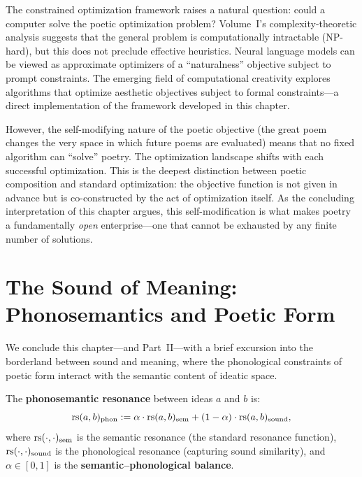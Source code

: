 \begin{remark}
\label{rem:algorithmic-limits}
The constrained optimization framework raises a natural question: could a computer solve the poetic optimization problem?  Volume~I's complexity-theoretic analysis suggests that the general problem is computationally intractable (NP-hard), but this does not preclude effective heuristics.  Neural language models can be viewed as approximate optimizers of a ``naturalness'' objective subject to prompt constraints.  The emerging field of computational creativity explores algorithms that optimize aesthetic objectives subject to formal constraints---a direct implementation of the framework developed in this chapter.

However, the self-modifying nature of the poetic objective (the great poem changes the very space in which future poems are evaluated) means that no fixed algorithm can ``solve'' poetry.  The optimization landscape shifts with each successful optimization.  This is the deepest distinction between poetic composition and standard optimization: the objective function is not given in advance but is co-constructed by the act of optimization itself.  As the concluding interpretation of this chapter argues, this self-modification is what makes poetry a fundamentally \emph{open} enterprise---one that cannot be exhausted by any finite number of solutions.
\end{remark}


\section{The Sound of Meaning: Phonosemantics and Poetic Form}

We conclude this chapter---and Part~II---with a brief excursion into the
borderland between sound and meaning, where the phonological constraints of
poetic form interact with the semantic content of ideatic space.

\begin{definition}
\label{def:phonosemantic}
The \textbf{phonosemantic resonance} between ideas $a$ and $b$ is:
\[
  \mathrm{rs}(a, b)_{\text{phon}} := \alpha \cdot \mathrm{rs}(a, b)_{\text{sem}}
  + (1 - \alpha) \cdot \mathrm{rs}(a, b)_{\text{sound}},
\]
where $\mathrm{rs}(\cdot, \cdot)_{\text{sem}}$ is the semantic resonance (the
standard resonance function), $\mathrm{rs}(\cdot, \cdot)_{\text{sound}}$ is the
phonological resonance (capturing sound similarity), and $\alpha \in [0,1]$
is the \textbf{semantic--phonological balance}.
\end{definition}


